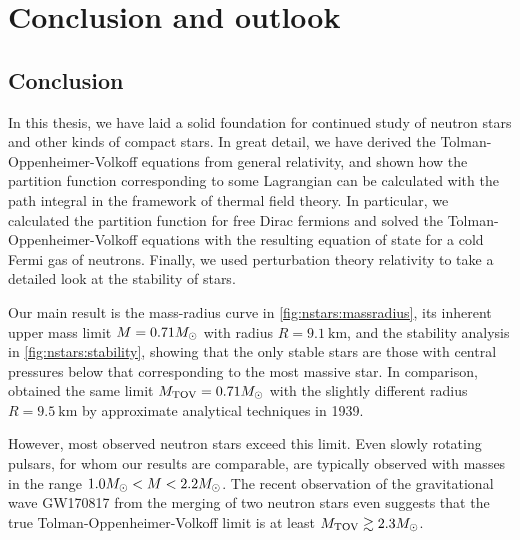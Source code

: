 \chapter{Conclusion and outlook}
\label{chap:conclusion}




\section{Conclusion}

In this thesis, we have laid a solid foundation for continued study of neutron stars and other kinds of compact stars.
In great detail, we have derived the Tolman-Oppenheimer-Volkoff equations from general relativity, and shown how the partition function corresponding to some Lagrangian can be calculated with the path integral in the framework of thermal field theory.
In particular, we calculated the partition function for free Dirac fermions and solved the Tolman-Oppenheimer-Volkoff equations with the resulting equation of state for a cold Fermi gas of neutrons.
Finally, we used perturbation theory relativity to take a detailed look at the stability of stars.

Our main result is the mass-radius curve in \cref{fig:nstars:massradius}, its inherent upper mass limit $M = 0.71 M_\odot$ with radius $R = \SI{9.1}{\kilo\meter}$, and the stability analysis in \cref{fig:nstars:stability}, showing that the only stable stars are those with central pressures below that corresponding to the most massive star.
In comparison, \cite{ref:tov} obtained the same limit $M_\text{TOV} = 0.71 M_\odot$ with the slightly different radius $R = \SI{9.5}{\kilo\meter}$ by approximate analytical techniques in 1939.

However, most observed neutron stars exceed this limit.
Even slowly rotating pulsars, for whom our results are comparable, \cite[section 2.1]{ref:neutron_star_physics} are typically observed with masses in the range $1.0 M_\odot < M < 2.2 M_\odot$. \cite[figure 2 and 3]{ref:neutron_star_masses_paper}
The recent observation of the gravitational wave GW170817 from the merging of two neutron stars even suggests that the true Tolman-Oppenheimer-Volkoff limit is at least $M_\text{TOV} \gtrsim 2.3 M_\odot$. \cite{ref:gravitational_wave_tov_limit}

